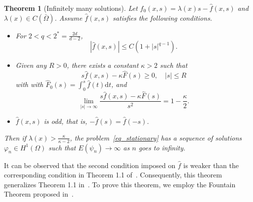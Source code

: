 \documentclass{elsarticle}
\newtheorem{theorem}{Theorem}[section]
\begin{document}
\begin{theorem}[Infinitely many solutions] \label{equilibria:infinity}
Let $f_0(x, s) = \lambda(x)s - \hat{f}(x, s)$ and $\lambda(x)\in C(\bar{\Omega})$. Assume $\hat{f}(x, s)$ satisfies the following conditions.
\begin{itemize}
	\item[{\rm(1)}] For $2<q<2^{\ast}=\frac{2d}{d-2}$, 
		\[
			|\hat{f}(x, s)|\leqslant C\left( 1+ |s|^{q-1} \right).
		\]
	\item[{\rm(2)}] Given any $R>0$, there exists a constant $\kappa > 2$ such that
		\[
			s\hat{f}(x, s)-\kappa\hat{F}(s) \geqslant 0, \quad |s|\leqslant R
		\]
		with with $\hat{F}_0(s) = \int_{0}^{s}\hat{f}(t)\mathrm{d}t$, and
		\[
			\lim_{|s|\rightarrow\infty}\frac{s\hat{f}(x, s)-\kappa\hat{F}(s)}{s^2} = 1-\frac{\kappa}{2}.
		\]
	\item[{\rm(3)}] $\hat{f}(x, s)$ is odd, that is, $-\hat{f}(s)=\hat{f}(-s)$.
\end{itemize}
Then if $\lambda(x) > \frac{\kappa}{\kappa-2}$, the problem~\eqref{eq_stationary} has a sequence of solutions $\varphi_n\in H^1(\Omega)$ such that $E(\psi_n)\rightarrow\infty$ as $n$ goes to infinity.
\end{theorem}
It can be observed that the second condition imposed on \(\hat{f}\) is weaker than the corresponding condition in Theorem 1.1 of~\cite{Zhao2008}. Consequently, this theorem generalizes Theorem 1.1 in~\cite{Zhao2008}. To prove this theorem, we employ the Fountain Theorem proposed in~\cite{willem2012minimax}.
\end{document}
